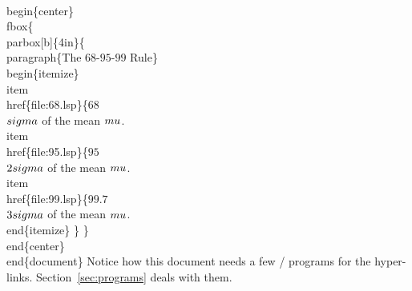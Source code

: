 \\begin\{center\}
\\fbox\{
  \\parbox[b]\{4in\}\{
    \\paragraph\{The $68$-$95$-$99$ Rule\}
    \\begin\{itemize\}
    \\item \\href\{file:68.lsp\}\{$68$\\%
      $\\sigma$ of the mean $\\mu$.
    \\item \\href\{file:95.lsp\}\{$95$\\%
      $2\\sigma$ of the mean $\\mu$.
    \\item \\href\{file:99.lsp\}\{$99.7$\\%
      $3\\sigma$ of the mean $\\mu$.
    \\end\{itemize\}
    \}
  \}
\\end\{center\}
\\end\{document\}
\nwendcode{}\nwdocspar
Notice how this document needs a few \xls/ programs for the
hyper-links. Section~\ref{sec:programs} deals with them.

